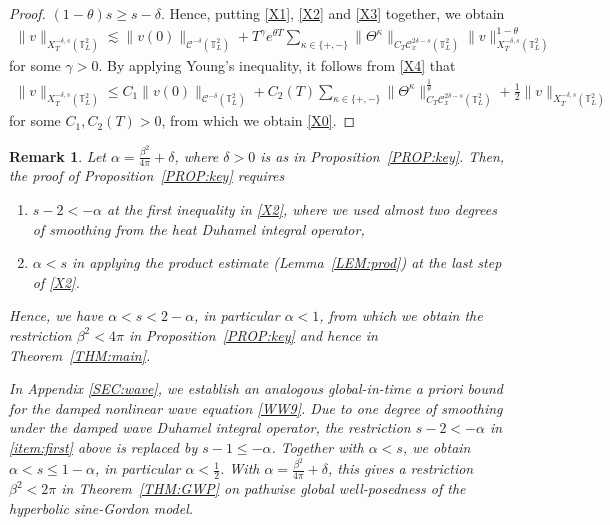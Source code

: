 \documentclass[letterpaper, 11pt,  reqno]{amsart}
\theoremstyle{myremark}
\newtheorem{remark}[theorem]{Remark}
\newcommand{\Ta}{\Theta}
\newcommand{\1}{\hspace{0.5mm}\text{I}\hspace{0.5mm}}
\newcommand{\T}{\mathbb{T}}
\newcommand{\CC}{\mathcal{C}}
\newcommand{\al}{\alpha}
\newcommand{\be}{\beta}
\newcommand{\dl}{\delta}
\newcommand{\kk}{\kappa}
\newcommand{\g}{\gamma}
\newcommand{\ta}{\theta}
\newcommand{\les}{\lesssim}
\numberwithin{equation}{section}
\numberwithin{theorem}{section}
\begin{document}
\begin{proof}
$(1-\ta)s  \ge s-\delta$.
Hence, putting \eqref{X1}, \eqref{X2} and \eqref{X3} together, 
we obtain
\begin{align}
\|v\|_{X^{-\dl, s}_T(\T_L^2)} \les \|v(0)\|_{\CC^{-\dl}(\T^2_L)} + 
T^{\g} e^{\ta T} 
\sum_{\kk \in \{+, -\}}
  \| \Ta^\kk \|_{C_T \CC_x^{2\dl-s}(\T^2_L)} \|v\|_{X^{-\dl,s}_T(\T_L^2)}^{1-\ta}
\label{X4}
\end{align}
for some  $\g >0$.
By applying  Young's inequality, 
it follows from  \eqref{X4} that 
\begin{align*}
\|v\|_{X^{-\dl, s}_T(\T^2_L)} \le C_1 \|v(0)\|_{\CC^{-\dl}(\T^2_L)} + 
C_2(T)  \sum_{\kk \in \{+, -\}} \| \Ta^\kk \|_{C_T \CC_x^{2\dl-s}(\T^2_L)}^\frac1 \ta + \frac{1}{2} 
\|v\|_{X^{-\dl,s}_T(\T^2_L)}
\end{align*}
for some $C_1, C_2(T) > 0$, 
from which we obtain \eqref{X0}.
\end{proof}




\begin{remark}
Let $\al = \frac{\be^2}{4\pi} + \dl$, where $\dl > 0$
is as in Proposition~\ref{PROP:key}.
Then,  the proof of 
 Proposition~\ref{PROP:key}
requires 

 \begin{enumerate}[leftmargin=2em]
 \item\label{item:first}
  $s- 2 < - \al$ at the first inequality in \eqref{X2}, 
  where we used  almost two  degrees
  of smoothing from the heat Duhamel integral operator, 

\item
$\al < s$
in applying the product estimate (Lemma~\ref{LEM:prod})
at the last step of \eqref{X2}.

  \end{enumerate}
Hence, we have $\al< s < 2- \al$,
in particular $\al< 1$, 
from which we obtain the restriction $\be^2 < 4\pi$
in Proposition~\ref{PROP:key}
and hence in Theorem~\ref{THM:main}.



In Appendix \ref{SEC:wave}, 
we establish
an analogous global-in-time a priori bound
for the damped nonlinear wave equation \eqref{WW9}.
Due to one degree of smoothing under the damped
wave Duhamel integral operator, 
the restriction $s - 2 <  - \al $ in \ref{item:first} above
is replaced by $s - 1 \le - \al$.
Together with $\al < s$, 
we obtain $\al < s \le 1 - \al$, in particular $\al < \frac 12$.
With $\al = \frac{\be^2}{4\pi} + \dl$, 
this gives a restriction $\be^2 < 2\pi$
in Theorem~\ref{THM:GWP}
on pathwise global well-posedness
of the hyperbolic sine-Gordon model.
\end{remark}
\end{document}
